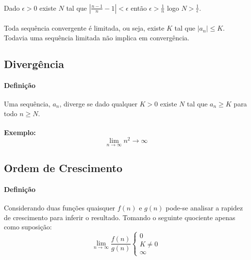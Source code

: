 \documentclass{article}
\begin{document}
            \paragraph{}Dado $\epsilon>0$ existe $N$ tal que $|\frac{n-1}{n}-1|<\epsilon$ então $\epsilon>\frac{1}{n}$ logo $N>\frac{1}{\epsilon}$.
            \paragraph{} Toda sequência convergente é limitada, ou seja, existe $K$ tal que $|a_{n}| \le K$. Todavia uma sequência limitada não implica em convergência.
        
        \subsection{Divergência}
            \paragraph{Definição}Uma sequência, $a_{n}$, diverge se dado qualquer $K>0$ existe $N$ tal que $a_{n} \ge K$ para todo $n \ge N$.
            \paragraph{}\textbf{Exemplo:} 
                \begin{equation}
                    \lim_{n\to\infty}n^{2} \rightarrow \infty
                \end{equation}
        
        \subsection{Ordem de Crescimento}
            \paragraph{Definição}Considerando duas funções quaisquer $f(n)$ e $g(n)$ pode-se analisar a rapidez de crescimento para inferir o resultado. Tomando o seguinte quociente apenas como suposição:
                \begin{equation}
                    \lim\limits_{n\to\infty}\frac{f(n)}{g(n)}\left \{ \begin{matrix} 0\\ K\ne0\\ \infty\end{matrix}\right.
                \end{equation}
\end{document}
